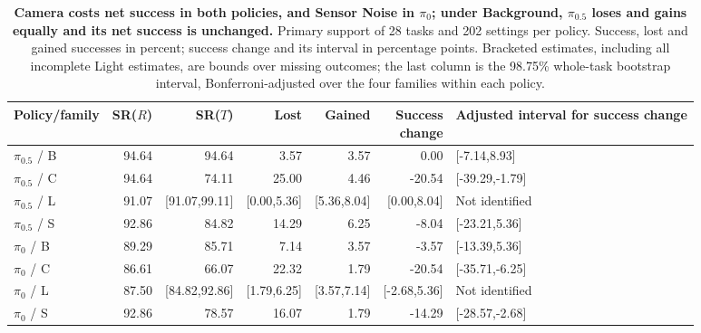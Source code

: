 \begin{table}[t]
\caption{\textbf{Camera costs net success in both policies, and Sensor Noise in $\pi_0$; under Background, $\pi_{0.5}$ loses and gains equally and its net success is unchanged.} Primary support of 28 tasks and 202 settings per policy. Success, lost and gained successes in percent; success change and its interval in percentage points. Bracketed estimates, including all incomplete Light estimates, are bounds over missing outcomes; the last column is the 98.75\% whole-task bootstrap interval, Bonferroni-adjusted over the four families within each policy.}

\centering\small
\setlength{\tabcolsep}{5pt}
\begin{tabular}{lrrrrrl}
\toprule
Policy/family & SR($R$) & SR($T$) & Lost & Gained & \shortstack{Success\\change} & Adjusted interval for success change\\
\midrule
$\pi_{0.5}$ / B & 94.64 & 94.64 & 3.57 & 3.57 & 0.00 & [-7.14,8.93]\\
$\pi_{0.5}$ / C & 94.64 & 74.11 & 25.00 & 4.46 & -20.54 & [-39.29,-1.79]\\
$\pi_{0.5}$ / L & 91.07 & [91.07,99.11] & [0.00,5.36] & [5.36,8.04] & [0.00,8.04] & Not identified\\
$\pi_{0.5}$ / S & 92.86 & 84.82 & 14.29 & 6.25 & -8.04 & [-23.21,5.36]\\
$\pi_0$ / B & 89.29 & 85.71 & 7.14 & 3.57 & -3.57 & [-13.39,5.36]\\
$\pi_0$ / C & 86.61 & 66.07 & 22.32 & 1.79 & -20.54 & [-35.71,-6.25]\\
$\pi_0$ / L & 87.50 & [84.82,92.86] & [1.79,6.25] & [3.57,7.14] & [-2.68,5.36] & Not identified\\
$\pi_0$ / S & 92.86 & 78.57 & 16.07 & 1.79 & -14.29 & [-28.57,-2.68]\\
\bottomrule
\end{tabular}

\label{tab:five-arm-outcomes}
\end{table}

